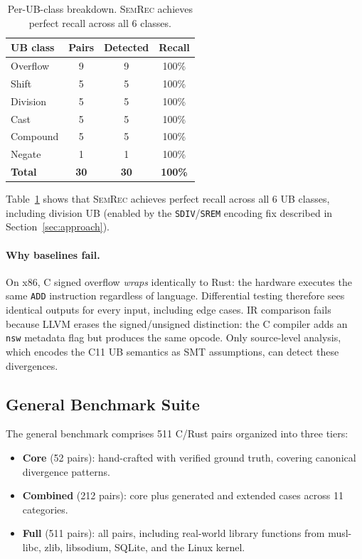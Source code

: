 \documentclass[10pt,a4paper]{article}
\begin{document}
\begin{table}[t]
\centering
\small
\caption{Per-UB-class breakdown.  \textsc{SemRec} achieves perfect
recall across all 6 classes.}
\label{tab:ub-class}
\begin{tabular}{@{}lccc@{}}
\toprule
UB class & Pairs & Detected & Recall \\
\midrule
Overflow    & 9 & 9 & 100\% \\
Shift       & 5 & 5 & 100\% \\
Division    & 5 & 5 & 100\% \\
Cast        & 5 & 5 & 100\% \\
Compound    & 5 & 5 & 100\% \\
Negate      & 1 & 1 & 100\% \\
\midrule
\textbf{Total} & \textbf{30} & \textbf{30} & \textbf{100\%} \\
\bottomrule
\end{tabular}
\end{table}

Table~\ref{tab:ub-class} shows that \textsc{SemRec} achieves perfect
recall across all 6 UB classes, including division UB (enabled by
the \texttt{SDIV}/\texttt{SREM} encoding fix described in
Section~\ref{sec:approach}).

\paragraph{Why baselines fail.}
On x86, C signed overflow \emph{wraps} identically to Rust: the
hardware executes the same \texttt{ADD} instruction regardless of
language.  Differential testing therefore sees identical outputs for
every input, including edge cases.  IR comparison fails because LLVM
erases the signed/unsigned distinction: the C compiler adds an
\texttt{nsw} metadata flag but produces the same opcode.  Only
source-level analysis, which encodes the C11 UB semantics as SMT
assumptions, can detect these divergences.

\subsection{General Benchmark Suite}\label{sec:benchmark}

The general benchmark comprises 511 C/Rust pairs organized into three tiers:
\begin{itemize}[nosep]
  \item \textbf{Core} (52 pairs): hand-crafted with verified ground
    truth, covering canonical divergence patterns.
  \item \textbf{Combined} (212 pairs): core plus generated and
    extended cases across 11 categories.
  \item \textbf{Full} (511 pairs): all pairs, including real-world
    library functions from musl-libc, zlib, libsodium, SQLite, and
    the Linux kernel.
\end{itemize}
\end{document}
